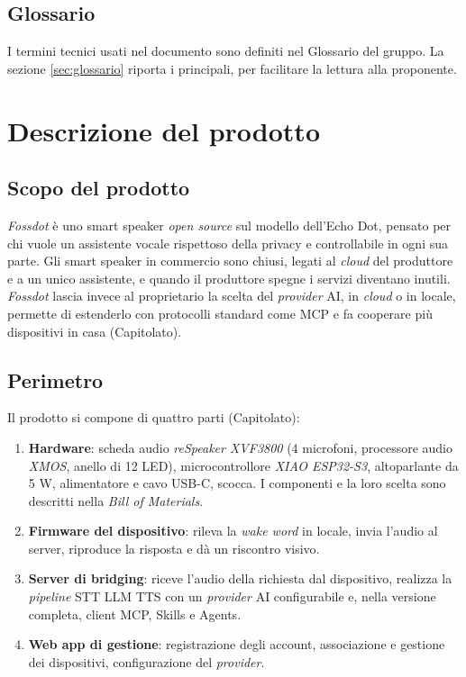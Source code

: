 \documentclass[12pt,a4paper]{article}
\newcommand{\tightlist}{\setlength{\itemsep}{1pt}\setlength{\parskip}{0pt}}
\begin{document}
\subsection{Glossario}

I termini tecnici usati nel documento sono definiti nel Glossario del gruppo. La sezione \ref{sec:glossario} riporta i principali, per facilitare la lettura alla proponente.

\section{Descrizione del prodotto}

\subsection{Scopo del prodotto}

\emph{Fossdot} è uno smart speaker \emph{open source} sul modello dell'Echo Dot, pensato per chi vuole un assistente vocale rispettoso della privacy e controllabile in ogni sua parte. Gli smart speaker in commercio sono chiusi, legati al \emph{cloud} del produttore e a un unico assistente, e quando il produttore spegne i servizi diventano inutili. \emph{Fossdot} lascia invece al proprietario la scelta del \emph{provider} AI, in \emph{cloud} o in locale, permette di estenderlo con protocolli standard come MCP e fa cooperare più dispositivi in casa (Capitolato).

\subsection{Perimetro}

Il prodotto si compone di quattro parti (Capitolato):

\begin{enumerate}
\tightlist
\item \textbf{Hardware}: scheda audio \emph{reSpeaker XVF3800} (4 microfoni, processore audio \emph{XMOS}, anello di 12 LED), microcontrollore \emph{XIAO ESP32-S3}, altoparlante da 5 W, alimentatore e cavo USB-C, scocca. I componenti e la loro scelta sono descritti nella \emph{Bill of Materials}.
\item \textbf{Firmware del dispositivo}: rileva la \emph{wake word} in locale, invia l'audio al server, riproduce la risposta e dà un riscontro visivo.
\item \textbf{Server di bridging}: riceve l'audio della richiesta dal dispositivo, realizza la \emph{pipeline} STT \textrightarrow{} LLM \textrightarrow{} TTS con un \emph{provider} AI configurabile e, nella versione completa, client MCP, Skills e Agents.
\item \textbf{Web app di gestione}: registrazione degli account, associazione e gestione dei dispositivi, configurazione del \emph{provider}.
\end{enumerate}
\end{document}
